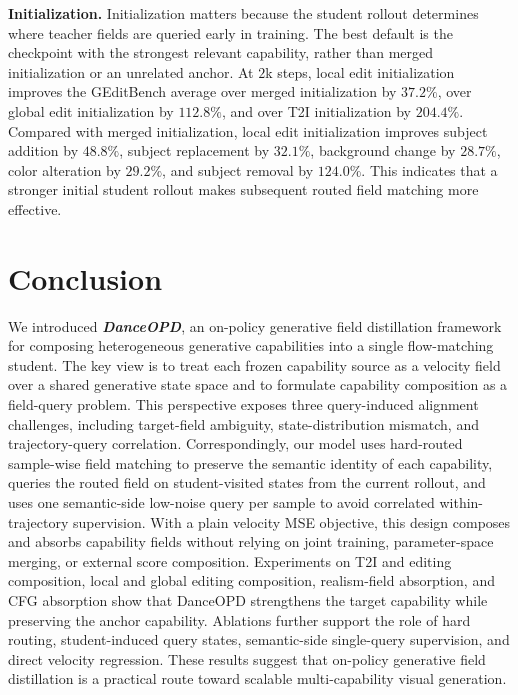 \documentclass{llmxive}
\providecommand{\name}{\textsl{\textbf{DanceOPD}}\xspace}
\begin{document}
\noindent\textbf{Initialization.}
Initialization matters because the student rollout determines where teacher fields are queried early in training. The best default is the checkpoint with the strongest relevant capability, rather than merged initialization or an unrelated anchor. At $2$k steps, local edit initialization improves the GEditBench average over merged initialization by $37.2\%$, over global edit initialization by $112.8\%$, and over T2I initialization by $204.4\%$. Compared with merged initialization, local edit initialization improves subject addition by $48.8\%$, subject replacement by $32.1\%$, background change by $28.7\%$, color alteration by $29.2\%$, and subject removal by $124.0\%$. This indicates that a stronger initial student rollout makes subsequent routed field matching more effective.



\section{Conclusion}

We introduced \name{}, an on-policy generative field distillation framework for composing heterogeneous generative capabilities into a single flow-matching student. The key view is to treat each frozen capability source as a velocity field over a shared generative state space and to formulate capability composition as a field-query problem. This perspective exposes three query-induced alignment challenges, including target-field ambiguity, state-distribution mismatch, and trajectory-query correlation. Correspondingly, our model uses hard-routed sample-wise field matching to preserve the semantic identity of each capability, queries the routed field on student-visited states from the current rollout, and uses one semantic-side low-noise query per sample to avoid correlated within-trajectory supervision. With a plain velocity MSE objective, this design composes and absorbs capability fields without relying on joint training, parameter-space merging, or external score composition. Experiments on T2I and editing composition, local and global editing composition, realism-field absorption, and CFG absorption show that DanceOPD strengthens the target capability while preserving the anchor capability. Ablations further support the role of hard routing, student-induced query states, semantic-side single-query supervision, and direct velocity regression. These results suggest that on-policy generative field distillation is a practical route toward scalable multi-capability visual generation.
\end{document}
